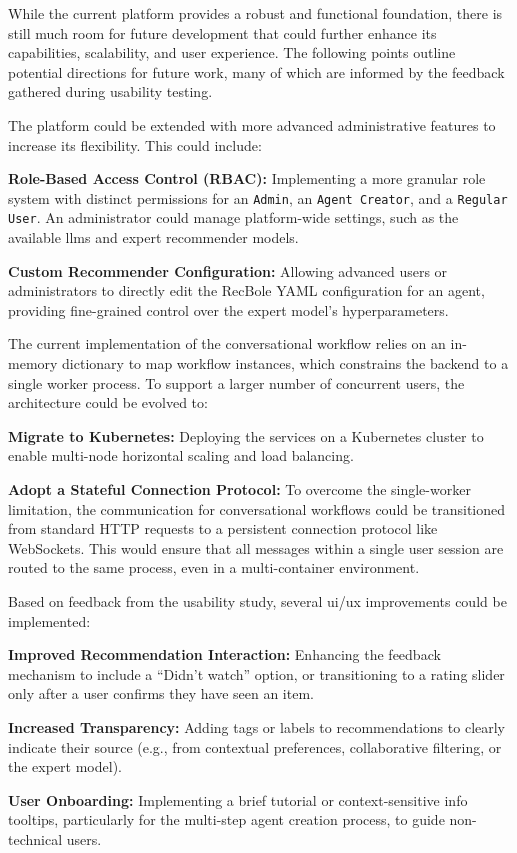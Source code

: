 While the current platform provides a robust and functional foundation, there is still much room for future development that could further enhance its capabilities, scalability, and user experience. The following points outline potential directions for future work, many of which are informed by the feedback gathered during usability testing.

The platform could be extended with more advanced administrative features to increase its flexibility. This could include:
\begin{compactitem}[\textbullet]
    \item \textbf{Role-Based Access Control (RBAC):} Implementing a more granular role system with distinct permissions for an \texttt{Admin}, an \texttt{Agent Creator}, and a \texttt{Regular User}. An administrator could manage platform-wide settings, such as the available \acp{llm} and expert recommender models.
    \item \textbf{Custom Recommender Configuration:} Allowing advanced users or administrators to directly edit the RecBole YAML configuration for an agent, providing fine-grained control over the expert model's hyperparameters.
\end{compactitem}

The current implementation of the conversational workflow relies on an in-memory dictionary to map workflow instances, which constrains the backend to a single worker process. To support a larger number of concurrent users, the architecture could be evolved to:
\begin{compactitem}[\textbullet]
    \item \textbf{Migrate to Kubernetes:} Deploying the services on a Kubernetes cluster to enable multi-node horizontal scaling and load balancing.
    \item \textbf{Adopt a Stateful Connection Protocol:} To overcome the single-worker limitation, the communication for conversational workflows could be transitioned from standard HTTP requests to a persistent connection protocol like WebSockets. This would ensure that all messages within a single user session are routed to the same process, even in a multi-container environment.
\end{compactitem}

Based on feedback from the usability study, several \acs{ui}/\acs{ux} improvements could be implemented:
\begin{compactitem}[\textbullet]
    \item \textbf{Improved Recommendation Interaction:} Enhancing the feedback mechanism to include a ``Didn't watch'' option, or transitioning to a rating slider only after a user confirms they have seen an item.
    \item \textbf{Increased Transparency:} Adding tags or labels to recommendations to clearly indicate their source (e.g., from contextual preferences, collaborative filtering, or the expert model).
    \item \textbf{User Onboarding:} Implementing a brief tutorial or context-sensitive info tooltips, particularly for the multi-step agent creation process, to guide non-technical users.
\end{compactitem}

